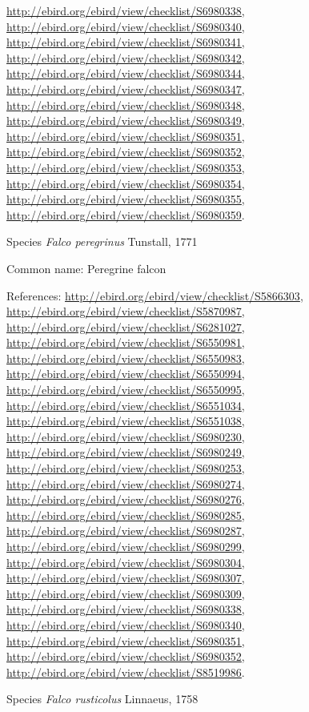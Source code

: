\documentclass[9pt, article]{memoir}
\begin{document}
\begin{multicols}{2}
\url{http://ebird.org/ebird/view/checklist/S6980338}, 
\url{http://ebird.org/ebird/view/checklist/S6980340}, 
\url{http://ebird.org/ebird/view/checklist/S6980341}, 
\url{http://ebird.org/ebird/view/checklist/S6980342}, 
\url{http://ebird.org/ebird/view/checklist/S6980344}, 
\url{http://ebird.org/ebird/view/checklist/S6980347}, 
\url{http://ebird.org/ebird/view/checklist/S6980348}, 
\url{http://ebird.org/ebird/view/checklist/S6980349}, 
\url{http://ebird.org/ebird/view/checklist/S6980351}, 
\url{http://ebird.org/ebird/view/checklist/S6980352}, 
\url{http://ebird.org/ebird/view/checklist/S6980353}, 
\url{http://ebird.org/ebird/view/checklist/S6980354}, 
\url{http://ebird.org/ebird/view/checklist/S6980355}, 
\url{http://ebird.org/ebird/view/checklist/S6980359}.

\vspace{6pt}\noindent\hspace{36pt}Species \textit{Falco peregrinus} Tunstall, 1771


Common name: Peregrine falcon

References: 
\url{http://ebird.org/ebird/view/checklist/S5866303}, 
\url{http://ebird.org/ebird/view/checklist/S5870987}, 
\url{http://ebird.org/ebird/view/checklist/S6281027}, 
\url{http://ebird.org/ebird/view/checklist/S6550981}, 
\url{http://ebird.org/ebird/view/checklist/S6550983}, 
\url{http://ebird.org/ebird/view/checklist/S6550994}, 
\url{http://ebird.org/ebird/view/checklist/S6550995}, 
\url{http://ebird.org/ebird/view/checklist/S6551034}, 
\url{http://ebird.org/ebird/view/checklist/S6551038}, 
\url{http://ebird.org/ebird/view/checklist/S6980230}, 
\url{http://ebird.org/ebird/view/checklist/S6980249}, 
\url{http://ebird.org/ebird/view/checklist/S6980253}, 
\url{http://ebird.org/ebird/view/checklist/S6980274}, 
\url{http://ebird.org/ebird/view/checklist/S6980276}, 
\url{http://ebird.org/ebird/view/checklist/S6980285}, 
\url{http://ebird.org/ebird/view/checklist/S6980287}, 
\url{http://ebird.org/ebird/view/checklist/S6980299}, 
\url{http://ebird.org/ebird/view/checklist/S6980304}, 
\url{http://ebird.org/ebird/view/checklist/S6980307}, 
\url{http://ebird.org/ebird/view/checklist/S6980309}, 
\url{http://ebird.org/ebird/view/checklist/S6980338}, 
\url{http://ebird.org/ebird/view/checklist/S6980340}, 
\url{http://ebird.org/ebird/view/checklist/S6980351}, 
\url{http://ebird.org/ebird/view/checklist/S6980352}, 
\url{http://ebird.org/ebird/view/checklist/S8519986}.

\vspace{6pt}\noindent\hspace{36pt}Species \textit{Falco rusticolus} Linnaeus, 1758



\end{multicols}
\end{document}
